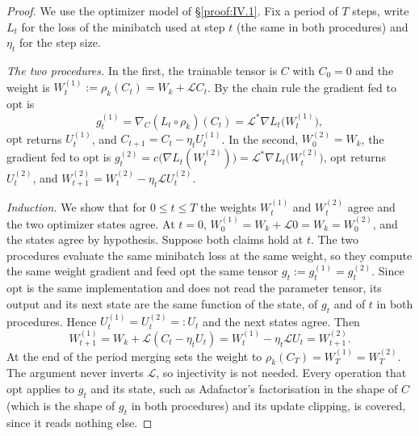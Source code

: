 \begin{proof}
We use the optimizer model of \S\ref{proof:IV.1}. Fix a period of $T$ steps, write $L_t$ for the loss of the minibatch used
at step $t$ (the same in both procedures) and $\eta_t$ for the step size.

\emph{The two procedures.} In the first, the trainable tensor is $C$ with $C_0=0$ and the weight is
$W^{(1)}_t:=\rho_k(C_t)=W_k+\mathcal LC_t$. By the chain rule the gradient fed to $\mathrm{opt}$ is
\[g^{(1)}_t=\nabla_C(L_t\circ\rho_k)(C_t)=\mathcal L^*\nabla L_t\big(W^{(1)}_t\big),\]
$\mathrm{opt}$ returns $U^{(1)}_t$, and $C_{t+1}=C_t-\eta_tU^{(1)}_t$. In the second, $W^{(2)}_0=W_k$, the gradient fed to
$\mathrm{opt}$ is $g^{(2)}_t=c\big(\nabla L_t(W^{(2)}_t)\big)=\mathcal L^*\nabla L_t\big(W^{(2)}_t\big)$, $\mathrm{opt}$ returns
$U^{(2)}_t$, and $W^{(2)}_{t+1}=W^{(2)}_t-\eta_t\mathcal LU^{(2)}_t$.

\emph{Induction.} We show that for $0\le t\le T$ the weights $W^{(1)}_t$ and $W^{(2)}_t$ agree and the two optimizer
states agree. At $t=0$, $W^{(1)}_0=W_k+\mathcal L0=W_k=W^{(2)}_0$, and the states agree by hypothesis. Suppose both claims
hold at $t$. The two procedures evaluate the same minibatch loss at the same weight, so they compute the same weight
gradient and feed $\mathrm{opt}$ the same tensor $g_t:=g^{(1)}_t=g^{(2)}_t$. Since $\mathrm{opt}$ is the same
implementation and does not read the parameter tensor, its output and its next state are the same function of the state,
of $g_t$ and of $t$ in both procedures. Hence $U^{(1)}_t=U^{(2)}_t=:U_t$ and the next states agree. Then
\[W^{(1)}_{t+1}=W_k+\mathcal L(C_t-\eta_tU_t)=W^{(1)}_t-\eta_t\mathcal LU_t=W^{(2)}_{t+1}.\]
At the end of the period merging sets the weight to $\rho_k(C_T)=W^{(1)}_T=W^{(2)}_T$. The argument never inverts
$\mathcal L$, so injectivity is not needed. Every operation that $\mathrm{opt}$ applies to $g_t$ and its state, such as
Adafactor's factorisation in the shape of $C$ (which is the shape of $g_t$ in both procedures) and its update clipping, is
covered, since it reads nothing else.


\end{proof}
